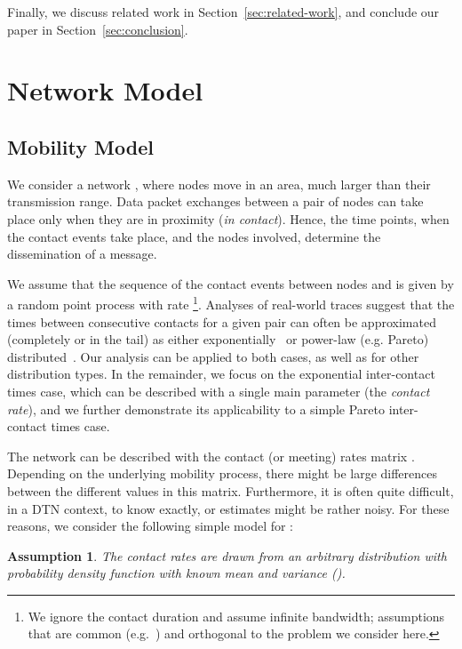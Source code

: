 \documentclass[journal]{IEEEtran}
\newtheorem{assumption}{Assumption}
\newcommand{\revisionRed}[1]{{#1}}\newcommand{\red}[1]{{#1}}
\begin{document}
\revisionRed{
Finally, we discuss related work in Section~\ref{sec:related-work}, and conclude our paper in Section~\ref{sec:conclusion}.
}





\section{Network Model}\label{sec:network-model}
\subsection{Mobility Model}\label{sec:mobility-model}
We consider a network , where  nodes move in an area, much larger than their transmission range. Data packet exchanges between a pair of nodes can take place only when they are in proximity (\textit{in contact}). Hence, the time points, when the contact events take place, and the nodes involved, determine the dissemination of a message.

We assume that the sequence of the contact events between nodes  and  is given by a random point process with rate \footnote{We ignore the contact duration and assume infinite bandwidth; assumptions that are common (e.g.~\cite{Gao-user-centric-DTN,multiple-offloading}) and orthogonal to the problem we consider here.}. Analyses of real-world traces suggest that the times between consecutive contacts for a given pair can often be approximated (completely or in the tail) as either exponentially~\cite{Gao2009,Conan2007} or power-law (e.g. Pareto) distributed~\cite{chaintreau-tmc}. \red{Our analysis can be applied to both cases, as well as for other distribution types. In the remainder, we focus on the exponential inter-contact times case, which can be described with a single main parameter  (the \textit{contact rate}), and we further demonstrate its applicability to a simple Pareto inter-contact times case.}

The network  can be described with the contact (or meeting) rates matrix . Depending on the underlying mobility process, there might be large differences between the different  values in this matrix. Furthermore, it is often quite difficult, in a DTN context, to know  exactly, or estimates might be rather noisy. For these reasons, we consider the following simple model for :

\begin{assumption}\label{ass:heterogeneous-mobility}
 The contact rates  are drawn from an arbitrary distribution with probability density function  with known mean  and variance  ().
\end{assumption}
\end{document}
